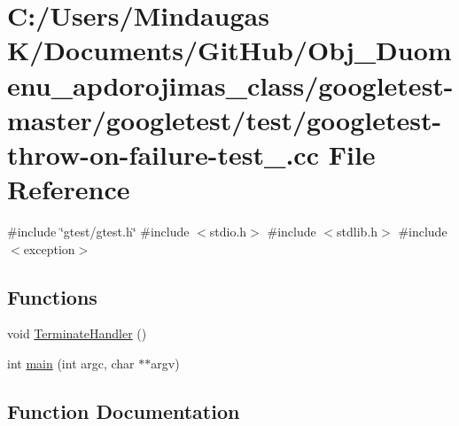 \hypertarget{googletest-master_2googletest_2test_2googletest-throw-on-failure-test___8cc}{}\section{C\+:/\+Users/\+Mindaugas K/\+Documents/\+Git\+Hub/\+Obj\+\_\+\+Duomenu\+\_\+apdorojimas\+\_\+class/googletest-\/master/googletest/test/googletest-\/throw-\/on-\/failure-\/test\+\_\+.cc File Reference}
\label{googletest-master_2googletest_2test_2googletest-throw-on-failure-test___8cc}
{\ttfamily \#include \char`\"{}gtest/gtest.\+h\char`\"{}}\newline
{\ttfamily \#include $<$stdio.\+h$>$}\newline
{\ttfamily \#include $<$stdlib.\+h$>$}\newline
{\ttfamily \#include $<$exception$>$}\newline
\subsection*{Functions}
\begin{DoxyCompactItemize}
\item 
void \mbox{\hyperlink{googletest-master_2googletest_2test_2googletest-throw-on-failure-test___8cc_a478ad0386ef3cac98d230812ed07eeda}{Terminate\+Handler}} ()
\item 
int \mbox{\hyperlink{googletest-master_2googletest_2test_2googletest-throw-on-failure-test___8cc_a3c04138a5bfe5d72780bb7e82a18e627}{main}} (int argc, char $\ast$$\ast$argv)
\end{DoxyCompactItemize}


\subsection{Function Documentation}
\mbox{\label{googletest-master_2googletest_2test_2googletest-throw-on-failure-test___8cc_a3c04138a5bfe5d72780bb7e82a18e627}} 
